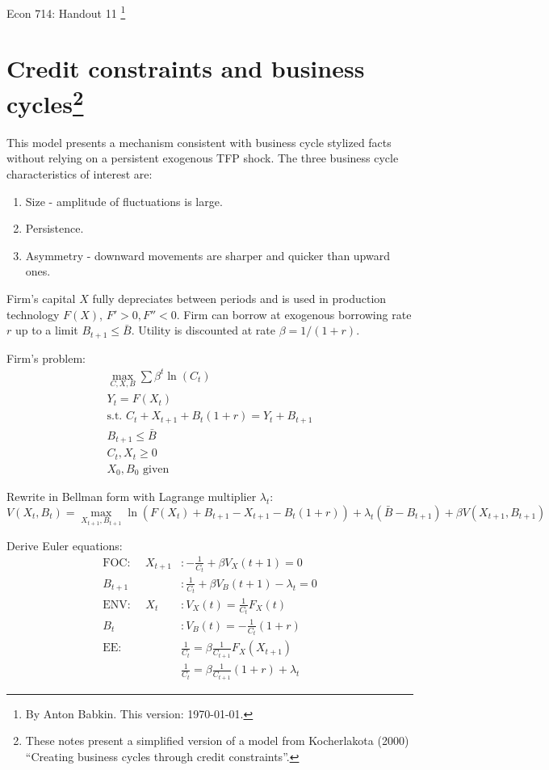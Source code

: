 \documentclass{article}
\title{Econ 714: Handout 11 \iftoggle{sol}{- Solution}{}}
\author{Anton Babkin}
\newcommand{\sol}[1]{\iftoggle{sol}{{\color{blue} #1 }}{}}
\begin{document}

{\Large Econ 714: Handout 11 \sol{- Solution}\footnote{By Anton Babkin. This version: \today.}}

\section*{Credit constraints and business cycles\footnote{These notes
    present a simplified version of a model from Kocherlakota (2000)
    ``Creating business cycles through credit constraints''.}}

This model presents a mechanism consistent with business cycle
stylized facts without relying on a persistent exogenous TFP
shock. The three business cycle characteristics of interest are:
\begin{enumerate}
\item Size - amplitude of fluctuations is large.
\item Persistence.
\item Asymmetry - downward movements are sharper and quicker than
  upward ones.
\end{enumerate}

Firm's capital $X$ fully depreciates between periods and is used in
production technology $F(X)$, $F'>0, F''<0$. Firm can borrow at
exogenous borrowing rate $r$ up to a limit
$B_{t+1}\le\bar{B}$. Utility is discounted at rate $\beta=1/(1+r)$.

Firm's problem:
\begin{gather*}
  \max_{C,X,B} \sum \beta^t \ln(C_t)\\
  Y_t=F(X_t)\\
  \text{s.t. } C_t+X_{t+1}+B_t(1+r)=Y_t+B_{t+1}\\
  B_{t+1}\le\bar{B}\\
  C_t,X_t\ge 0\\
  X_0,B_0\text{ given}
\end{gather*}

Rewrite in Bellman form with Lagrange multiplier $\lambda_t$:
\begin{equation*}
  V(X_t,B_t)=\max_{X_{t+1},B_{t+1}}\ln(F(X_t)+B_{t+1}-X_{t+1}-B_t(1+r))+\lambda_t(\bar{B}-B_{t+1})+\beta V(X_{t+1},B_{t+1})
\end{equation*}

Derive Euler equations:
\begin{align}
  \text{FOC: } \quad X_{t+1} & : -\frac{1}{C_t}+\beta V_X(t+1)=0\nonumber\\
  B_{t+1} &: \frac{1}{C_t}+\beta V_B(t+1)-\lambda_t=0\nonumber\\
  \text{ENV: } \quad X_t & : V_X(t)=\frac{1}{C_t}F_X(t)\nonumber\\
  B_t & : V_B(t)=-\frac{1}{C_t}(1+r)\nonumber\\
  \text{EE: } \quad & \frac{1}{C_t}=\beta\frac{1}{C_{t+1}}F_X(X_{t+1})\label{eq:eex}\tag{$EE_X$}\\
                            & \frac{1}{C_t}=\beta\frac{1}{C_{t+1}}(1+r)+\lambda_t\label{eq:eeb}\tag{$EE_B$}
\end{align}
\end{document}
